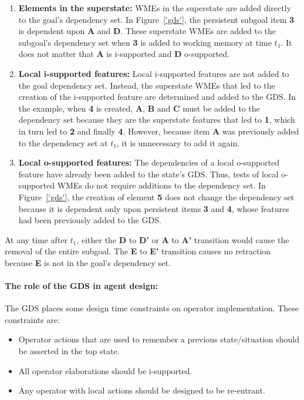 \vspace{-10pt}
\begin{enumerate}
	\item \textbf{Elements in the superstate:} 
		WMEs in the superstate are added directly to the goal's dependency set. In Figure~\ref{'gds'}, the persistent subgoal item {\bf 3} is dependent upon {\bf A} and {\bf D}. These superstate WMEs are added to the subgoal's dependency set when {\bf 3} is added to working memory at time $t_1$. It does not matter that {\bf A} is i-supported and {\bf D} o-supported.
	\item \textbf{Local i-supported features:} 
		Local i-supported features are not added to the goal dependency set.  Instead, the superstate WMEs that led to the creation of the i-supported feature are determined and added to the GDS. In the example, when {\bf 4} is created, {\bf A}, {\bf B} and {\bf C} must be added to the dependency set because they are the superstate features that led to {\bf 1}, which in turn led to {\bf 2} and finally {\bf 4}. However, because item {\bf A} was previously added to the dependency set at $t_1$, it is unnecessary to add it again.
	\item \textbf{Local o-supported features:} 
		The dependencies of a local o-supported feature have already been added to the state's GDS. Thus, tests of local o-supported WMEs do not require additions to the dependency set. In Figure~\ref{'gds'}, the creation of element {\bf 5} does not change the dependency set because it is dependent only upon persistent items {\bf 3} and {\bf 4}, whose features had been previously added to the GDS.
\end{enumerate}

At any time after $t_1$, either the {\bf D} to {\bf D'} or {\bf A} to {\bf A'} transition would cause the removal of the entire subgoal. The {\bf E} to {\bf E'} transition causes no retraction because {\bf E} is not in the goal's dependency set.

\paragraph{The role of the GDS in agent design:}

The GDS places some design time constraints on operator implementation. These constraints are:

\vspace{-10pt}
\begin{itemize} 
	\item Operator actions that are used to remember a previous state/situation should be asserted in the top state.
	\vspace{-8pt}
	\item All operator elaborations should be i-supported.
	\vspace{-8pt}
	\item Any operator with local actions should be designed to be re-entrant.
\end{itemize}

